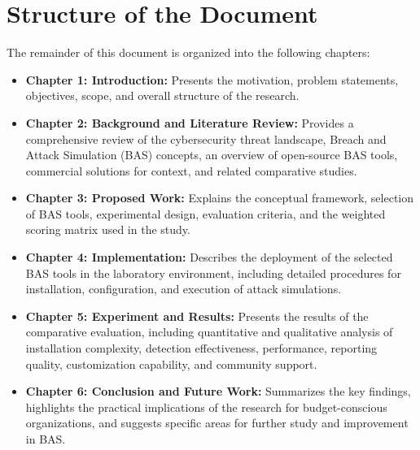 \section{Structure of the Document}\label{sec:Structure}
The remainder of this document is organized into the following chapters:

\begin{itemize}
    \item \textbf{Chapter 1: Introduction:} Presents the motivation, problem statements, objectives, scope, and overall structure of the research.
    \item \textbf{Chapter 2: Background and Literature Review:} Provides a comprehensive review of the cybersecurity threat landscape, Breach and Attack Simulation (BAS) concepts, an overview of open-source BAS tools, commercial solutions for context, and related comparative studies.
    \item \textbf{Chapter 3: Proposed Work:} Explains the conceptual framework, selection of BAS tools, experimental design, evaluation criteria, and the weighted scoring matrix used in the study.
    \item \textbf{Chapter 4: Implementation:} Describes the deployment of the selected BAS tools in the laboratory environment, including detailed procedures for installation, configuration, and execution of attack simulations.
    \item \textbf{Chapter 5: Experiment and Results:} Presents the results of the comparative evaluation, including quantitative and qualitative analysis of installation complexity, detection effectiveness, performance, reporting quality, customization capability, and community support.
    \item \textbf{Chapter 6: Conclusion and Future Work:} Summarizes the key findings, highlights the practical implications of the research for budget-conscious organizations, and suggests specific areas for further study and improvement in BAS.
\end{itemize}